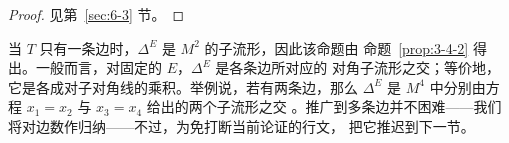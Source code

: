 \begin{proof}
见第~\ref{sec:6-3} 节。
\end{proof}

当 $T$ 只有一条边时，$\Delta^E$ 是 $M^2$ 的子流形，因此该命题由
命题~\ref{prop:3-4-2} 得出。一般而言，对固定的 $E$，$\Delta^E$ 是各条边所对应的
对角子流形之交；等价地，它是各成对子对角线的乘积。举例说，若有两条边，那么
$\Delta^E$ 是 $M^4$ 中分别由方程 $x_1=x_2$ 与 $x_3=x_4$ 给出的两个子流形之交
。推广到多条边并不困难——我们将对边数作归纳——不过，为免打断当前论证的行文，
把它推迟到下一节。

